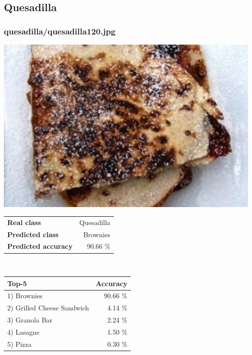 \subsection{Quesadilla}
    
\subsubsection{quesadilla/quesadilla120.jpg}

\begin{minipage}[t]{0.4\textwidth}
	\vspace{0pt}
	\includegraphics[width=\linewidth]{images/evaluation-images/quesadilla/quesadilla120.jpg}
\end{minipage}
\hfill
\begin{minipage}[t]{0.5\textwidth}
	\vspace{0pt}\raggedright
	\begin{tabularx}{\textwidth}{X r}
		\small \textbf{Real class} & \small Quesadilla\\
		\small \textbf{Predicted class} & \small Brownies\\
		\small \textbf{Predicted accuracy} & \small 90.66 \%
    \end{tabularx}\\
    
    \vspace{6pt}
	\begin{tabularx}{\textwidth}{X r}
        \small \textbf{Top-5} & \small \textbf{Accuracy} \\
        \hline
		\small 1) Brownies & \small 90.66 \%\\\small 2) Grilled Cheese Sandwich & \small 4.14 \%\\\small 3) Granola Bar & \small 2.24 \%\\\small 4) Lasagne & \small 1.50 \%\\\small 5) Pizza & \small 0.30 \%
    \end{tabularx}
\end{minipage}
    
